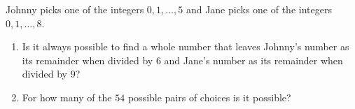Johnny picks one of the integers $0,1,\dots,5$ and Jane picks one of the integers $0,1,\dots,8$.
\begin{enumerate}
\item[(a)] Is it always possible to find a whole number that leaves Johnny's number as its remainder when divided by $6$ and Jane's number as its remainder when divided by $9$?
\item[(b)] For how many of the $54$ possible pairs of choices is it possible?
\end{enumerate}
